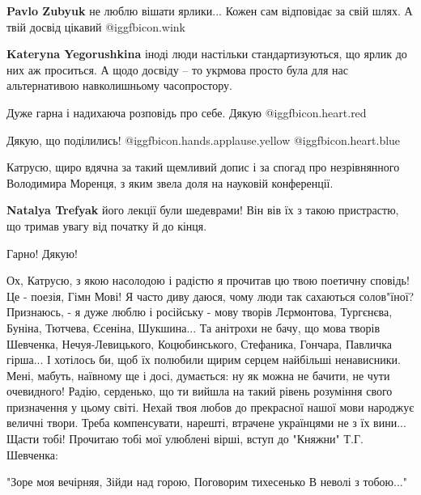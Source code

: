 \begin{itemize}
\begin{itemize} %
\textbf{Pavlo Zubyuk} не люблю вішати ярлики... Кожен сам відповідає за свій шлях.
А твій досвід цікавий @igg{fbicon.wink} 

\textbf{Kateryna Yegorushkina} іноді люди настільки стандартизуються, що ярлик до них аж проситься. А щодо досвіду – то укрмова просто була для нас альтернативою навколишньому часопростору.
\end{itemize} %

Дуже гарна і надихаюча розповідь про себе. Дякую @igg{fbicon.heart.red}

Дякую, що поділились!  @igg{fbicon.hands.applause.yellow}  @igg{fbicon.heart.blue} 


Катрусю, щиро вдячна за такий щемливий допис і за спогад про незрівнянного
Володимира Моренця, з яким звела доля на науковій конференції.

\begin{itemize} %
\textbf{Natalya Trefyak} його лекції були шедеврами! Він вів їх з такою пристрастю, що тримав увагу від початку й до кінця.
\end{itemize} %

Гарно! Дякую!


Ох, Катрусю, з якою насолодою і радістю я прочитав цю твою поетичну сповідь! Це
- поезія, Гімн Мові! Я часто диву даюся, чому люди так сахаються солов"їної?
Признаюсь, - я дуже люблю і російську - мову творів Лєрмонтова, Тургєнєва,
Буніна, Тютчева, Єсеніна, Шукшина... Та анітрохи не бачу, що мова творів
Шевченка, Нечуя-Левицького, Коцюбинського, Стефаника, Гончара, Павличка
гірша... І хотілось би, щоб їх полюбили щирим серцем найбільші ненависники.
Мені, мабуть, наївному ще і досі, думається: ну як можна не бачити, не чути
очевидного! Радію, серденько, що ти вийшла на такий рівень розуміння свого
призначення у цьому світі. Нехай твоя любов до прекрасної нашої мови народжує
величні твори. Треба компенсувати, нарешті, втрачене українцями не з їх вини...
Щасти тобі! Прочитаю тобі мої улюблені вірші, вступ до "Княжни" Т.Г. Шевченка:

"Зоре моя вечірняя, Зійди над горою, Поговорим тихесенько В неволі з тобою..."


\end{itemize}
